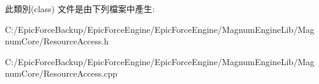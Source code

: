 此類別(class) 文件是由下列檔案中產生\+:\begin{DoxyCompactItemize}
\item 
C\+:/\+Epic\+Force\+Backup/\+Epic\+Force\+Engine/\+Epic\+Force\+Engine/\+Magnum\+Engine\+Lib/\+Magnum\+Core/Resource\+Access.\+h\item 
C\+:/\+Epic\+Force\+Backup/\+Epic\+Force\+Engine/\+Epic\+Force\+Engine/\+Magnum\+Engine\+Lib/\+Magnum\+Core/Resource\+Access.\+cpp\end{DoxyCompactItemize}
